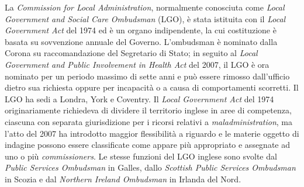 \documentclass[12pt,it,a4paper,]{report}
\begin{document}
La \emph{Commission for Local Administration}, normalmente conosciuta
come \emph{Local Government and Social Care Ombudsman} (LGO), è stata
istituita con il \emph{Local Government Act} del 1974 ed è un organo
indipendente, la cui costituzione è basata su sovvenzione annuale del
Governo. L'ombudsman è nominato dalla Corona su raccomandazione del
Segretario di Stato; in seguito al \emph{Local Government and Public
Involvement in Health Act} del 2007, il LGO è ora nominato per un
periodo massimo di sette anni e può essere rimosso dall'ufficio dietro
sua richiesta oppure per incapacità o a causa di comportamenti
scorretti. Il LGO ha sedi a Londra, York e Coventry. Il \emph{Local
Government Act} del 1974 originariamente richiedeva di dividere il
territorio inglese in aree di competenza, ciascuna con separata
giurisdizione per i ricorsi relativi a \emph{maladministration}, ma
l'atto del 2007 ha introdotto maggior flessibilità a riguardo e le
materie oggetto di indagine possono essere classificate come appare più
appropriato e assegnate ad uno o più \emph{commissioners}. Le stesse
funzioni del LGO inglese sono svolte dal \emph{Public Services
Ombudsman} in Galles, dallo \emph{Scottish Public Services Ombudsman} in
Scozia e dal \emph{Northern Ireland Ombudsman} in Irlanda del Nord.
\end{document}
